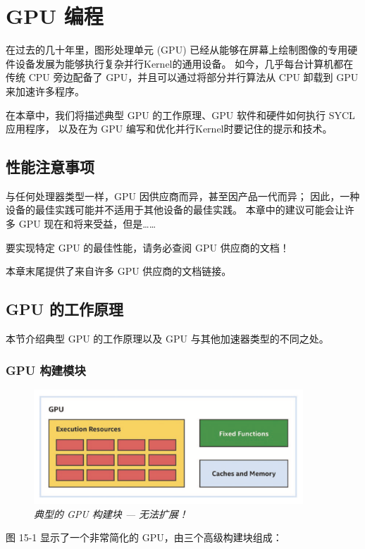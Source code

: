 \section{GPU 编程}
在过去的几十年里，图形处理单元 (GPU) 已经从能够在屏幕上绘制图像的专用硬件设备发展为能够执行复杂并行Kernel的通用设备。 
如今，几乎每台计算机都在传统 CPU 旁边配备了 GPU，并且可以通过将部分并行算法从 CPU 卸载到 GPU 来加速许多程序。

在本章中，我们将描述典型 GPU 的工作原理、GPU 软件和硬件如何执行 SYCL 应用程序，
以及在为 GPU 编写和优化并行Kernel时要记住的提示和技术。

\subsection{性能注意事项}
与任何处理器类型一样，GPU 因供应商而异，甚至因产品一代而异； 
因此，一种设备的最佳实践可能并不适用于其他设备的最佳实践。 
本章中的建议可能会让许多 GPU 现在和将来受益，但是……

\begin{remark}
	要实现特定 GPU 的最佳性能，请务必查阅 GPU 供应商的文档！
\end{remark}

本章末尾提供了来自许多 GPU 供应商的文档链接。

\subsection{GPU 的工作原理}
本节介绍典型 GPU 的工作原理以及 GPU 与其他加速器类型的不同之处。

\subsubsection{GPU 构建模块}
\begin{figure}[H]
	\centering
	\includegraphics[width=0.9\textwidth]{figs/F15.1.png}
	\caption{\textit{典型的 GPU 构建块 — 无法扩展！ }}
\end{figure}

图 15-1 显示了一个非常简化的 GPU，由三个高级构建块组成：

